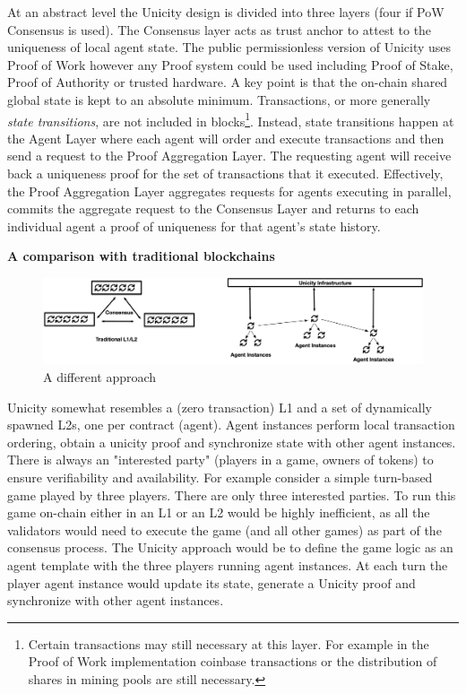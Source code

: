 \documentclass{article}
\begin{document}
At an abstract level the Unicity design is divided into three layers (four if PoW Consensus is used). The Consensus layer acts as trust anchor to attest to the uniqueness of local agent state. The public permissionless version of Unicity uses Proof of Work however any Proof system could be used including Proof of Stake, Proof of Authority or trusted hardware. A key point is that the on-chain shared global state is kept to an absolute minimum. Transactions, or more generally \textit{state transitions}, are not included in blocks\footnote{Certain transactions may still necessary at this layer. For example in the Proof of Work implementation coinbase transactions or the distribution of shares in mining pools are still necessary.}.
	Instead, state transitions happen at the Agent Layer where each agent will order and execute transactions and then send a request to the Proof Aggregation Layer. The requesting agent will receive back a uniqueness proof for the set of transactions that it executed. Effectively, the Proof Aggregation Layer aggregates requests for agents executing in parallel,  commits the aggregate request to the Consensus Layer and returns to each individual agent a proof of uniqueness for that agent's state history.
	
\vspace{2mm}

\textbf{A comparison with traditional blockchains}

\begin{figure}[htbp]
    \centering
    \includegraphics[width=1.0\textwidth]{Comparison.png}
    \caption{A different approach}
    \label{fig:layers}
\end{figure}

Unicity somewhat resembles a (zero transaction) L1 and a set of dynamically spawned L2s, one per contract (agent). Agent instances perform local transaction ordering, obtain a unicity proof and synchronize state with other agent instances. There is always an "interested party" (players in a game, owners of tokens) to ensure verifiability and availability. For example consider a simple turn-based game played by three players. There are only three interested parties. To run this game on-chain either in an L1 or an L2 would be highly inefficient, as all the validators would need to execute the game (and all other games) as part of the consensus process. The Unicity approach would be to define the game logic as an agent template with the three players running agent instances. At each turn the player agent instance would update its state, generate a Unicity proof and synchronize with other agent instances.
\end{document}
